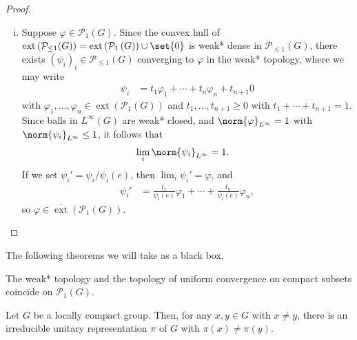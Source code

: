 \documentclass[10pt]{mypackage}
\begin{document}
\begin{proof}
\begin{enumerate}[(i)]
      Suppose $\varphi\in \mathcal{P}_{\leq 1}(G)\setminus \left( \mathcal{P}_1\left( G \right)\cup \set{0} \right)$, and set $t = \varphi(e)$, so that $0 < t < 1$, and $\frac{1}{t}\varphi\in \mathcal{P}_1\left( G \right)$. Then, we may write
      \begin{align*}
        \varphi &= t\left( \frac{1}{t}\varphi \right) + \left( 1-t \right)0,
      \end{align*}
      so that $\varphi\notin \operatorname{ext}\left( \mathcal{P}_{\leq 1}(G) \right)$, whence $\operatorname{ext}\left( \mathcal{P}_{\leq 1}(G) \right)\subseteq \operatorname{ext}\left( \mathcal{P}_{1}\left( G \right) \right)\cup \set{0}$.
    \item Suppose $\varphi\in \mathcal{P}_1\left( G \right)$. Since the convex hull of $\operatorname{ext}\left( \mathcal{P}_{\leq 1}(G) \right) = \operatorname{ext}\left( \mathcal{P}_1\left( G \right) \right)\cup \set{0}$ is weak* dense in $\mathcal{P}_{\leq 1}(G  )$, there exists $\left( \psi_i \right)_i\in \mathcal{P}_{\leq 1}\left( G \right)$ converging to $\varphi$ in the weak* topology, where we may write
      \begin{align*}
        \psi_i &= t_1\varphi_1 + \cdots + t_n\varphi_n + t_{n+1}0
      \end{align*}
      with $\varphi_1,\dots,\varphi_n\in \operatorname{ext}\left( \mathcal{P}_1\left( G \right) \right)$ and $t_1,\dots,t_{n+1}\geq 0$ with $t_1 + \cdots + t_{n+1} = 1$. Since balls in $L^{\infty}\left( G \right)$ are weak* closed, and $\norm{\varphi}_{L^{\infty}} = 1$ with $\norm{\psi_i}_{L^{\infty}}\leq 1$, it follows that
      \begin{align*}
        \lim_{i} \norm{\psi_i}_{L^{\infty}} &= 1.
      \end{align*}
      If we set $\psi_i' = \psi_i/\psi_i(e)$, then $\lim_{i}\psi_i' = \varphi$, and
      \begin{align*}
        \psi_i' &= \frac{t_1}{\psi_i(e)}\varphi_1 + \cdots + \frac{t_n}{\psi_i(e)}\varphi_n,
      \end{align*}
      so $\varphi\in \overline{\operatorname{ext}}\left( \mathcal{P}_1\left( G \right) \right)$.
  \end{enumerate}
\end{proof}
The following theorems we will take as a black box.
\begin{theorem}
  The weak* topology and the topology of uniform convergence on compact subsets coincide on $\mathcal{P}_1\left( G \right)$.
\end{theorem}
\begin{theorem}
  Let $G$ be a locally compact group. Then, for any $x,y\in G$ with $x\neq y$, there is an irreducible unitary representation $\pi$ of $G$ with $\pi(x)\neq \pi(y)$.
\end{theorem}
\end{document}
